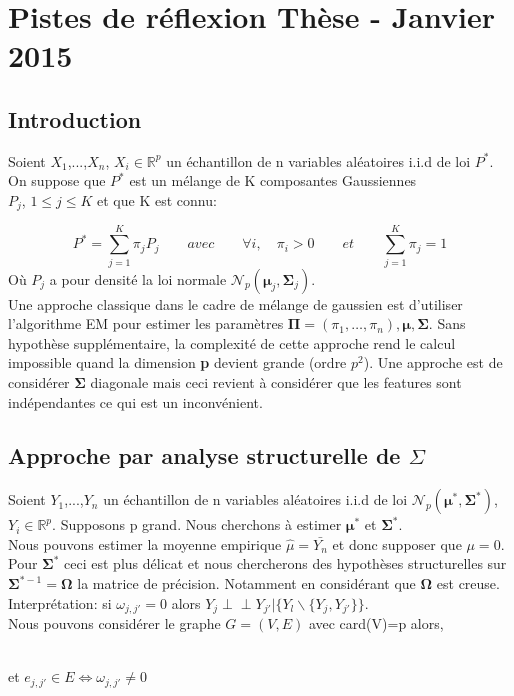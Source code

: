 \documentclass[12pt]{article}
\let\bb\mathbb       %
\def\RR{{\bb R}}\def\ZZ{{\bb Z}}\def\FF{{\bb F}}\def\DD{{\bb D}}
\def\bb{\mathbb}
\def\hat{\widehat}
\def\bSigma{\boldsymbol\Sigma}
\def\bOmega{\boldsymbol\Omega}
\def\bmu{\boldsymbol\mu}
\def\bPi{\boldsymbol\Pi}
\def\ci{\perp\!\!\!\perp}
\begin{document}
\section{Pistes de réflexion Thèse - Janvier 2015}
\subsection{Introduction}

Soient $X_1$,...,$X_n$, $X_i\in\RR^p$  un échantillon de n variables aléatoires i.i.d de loi $P^*$. On suppose que $P^*$ est un mélange de K composantes Gaussiennes\\ $P_j$, $1\le j\le K$ et que K est connu:

$$
P^* = \sum_{j=1}^K \pi_jP_j \qquad avec \qquad \forall i, \quad \pi_i>0 \qquad et \qquad \sum_{j=1}^K\pi_j=1
$$
Où $P_j$ a pour densité la loi normale  $\mathcal N_p(\bmu_j,\bSigma_j)$.
\\

Une approche classique dans le cadre de mélange de gaussien est d'utiliser l'algorithme EM pour estimer les paramètres $\bPi=(\pi_1,\dots,\pi_n),\bmu,\bSigma$. Sans hypothèse supplémentaire, la complexité de cette approche rend le calcul impossible quand la dimension \textbf{p} devient grande (ordre $p^2$). Une approche est de considérer $\bSigma$ diagonale mais ceci revient à considérer que les features sont indépendantes ce qui est un inconvénient.

\subsection{Approche par analyse structurelle de $\Sigma$}

Soient $Y_1$,...,$Y_n$ un échantillon de n variables aléatoires i.i.d de loi $\mathcal N_p(\bmu^*,\bSigma^*)$, $Y_i\in\RR^p$. Supposons p grand. Nous cherchons à estimer $\bmu^*$ et $\bSigma^*$.
\\
Nous pouvons estimer la moyenne empirique $\hat{\mu}=\bar{Y_n}$ et donc supposer que $\mu=0$. Pour $\bSigma^*$ ceci est plus délicat et nous chercherons des hypothèses structurelles sur $\bSigma^{*-1}=\bOmega$ la matrice de précision. Notamment en considérant que $\bOmega$ est creuse.
Interprétation: si $\omega_{j,j'}=0$ alors $Y_j \ci Y_{j'}|\{Y_l\backslash \{Y_j,Y_{j'}\}\}$.\\
Nous pouvons considérer le graphe $G=(V,E)$ avec card(V)=p alors,
\begin{figure}[!h]
\centering
{}
\end{figure}
\\
et $e_{j,j'}\in E \iff \omega_{j,j'} \neq 0$
\end{document}
